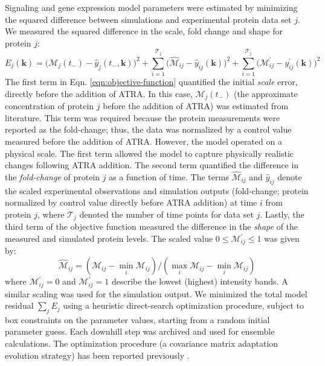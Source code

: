 \documentclass[12pt]{article}
\begin{document}
Signaling and gene expression model parameters were estimated by minimizing the squared difference between simulations and experimental protein data set $j$.
We measured the squared difference in the scale, fold change and shape for protein $j$:
\begin{equation}\label{eqn:objective-function}
	E_{j}(\mathbf{k}) = \biggl(\mathcal{M}_{j}\left(t_{-}\right)-\hat{y}_{j}\left(t_{-},\mathbf{k}\right)\biggr)^2+\sum_{i=1}^{\mathcal{T}_{j}}\biggl(\hat{\mathcal{M}}_{ij}-\hat{y}_{ij}(\mathbf{k})\biggr)^2 + \sum_{i=1}^{\mathcal{T}_{j}}\biggl(\mathcal{M}^{\prime}_{ij}-y^{\prime}_{ij}(\mathbf{k})\biggr)^2
\end{equation}
The first term in Eqn. \eqref{eqn:objective-function} quantified the initial \textit{scale} error, directly before the addition of ATRA.
In this case, $\mathcal{M}_{j}\left(t_{-}\right)$ (the approximate concentration of protein $j$ before the addition of ATRA) was estimated from literature.
This term was required because the protein measurements were reported as the fold-change; thus, the data was normalized by a control
value measured before the addition of ATRA. However, the model operated on a physical scale.
The first term allowed the model to capture physically realistic changes following ATRA addition.
The second term quantified the difference in the \textit{fold-change} of protein $j$ as a function of time.
The terms $\hat{\mathcal{M}}_{ij}$ and $\hat{y}_{ij}$ denote the scaled experimental observations and simulation outputs (fold-change; protein normalized by control value directly before ATRA addition)
at time $i$ from protein $j$,
where $\mathcal{T}_{j}$ denoted the number of time points for data set $j$.
Lastly, the third term of the objective function measured the difference in the \textit{shape} of the measured and simulated protein levels.
The scaled value $0\leq\mathcal{M}^{\prime}_{ij}\leq{1}$ was given by:
\begin{equation}\label{norm_exp_data}
\hat{\mathcal{M}}_{ij} = \left({\mathcal{M}_{ij} - \min_{i}\mathcal{M}_{ij}}\right)/\left({\max_{i}{\mathcal{M}_{ij}}-\min_{i}{\mathcal{M}_{ij}}}\right)
\end{equation}
where $\mathcal{M}^{\prime}_{ij}=0$ and $\mathcal{M}^{\prime}_{ij}=1$  describe the lowest (highest) intensity bands.
A similar scaling was used for the simulation output.
We minimized the total model residual $\sum_{j}E_{j}$ using a heuristic direct-search optimization procedure, subject to box constraints on the parameter values,
starting from a random initial parameter guess. Each downhill step was archived and used for ensemble calculations.
The optimization procedure (a covariance matrix adaptation evolution strategy) has been reported previously \cite{Igel:2007aa}.
\end{document}
